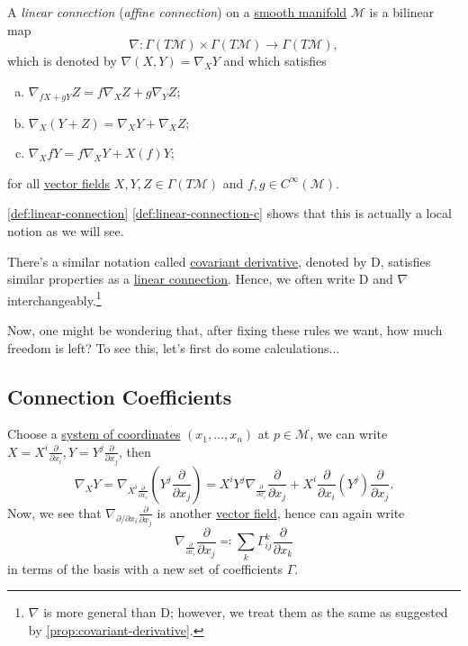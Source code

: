 \begin{definition}\label{def:linear-connection}
	A \emph{linear connection} (\emph{affine connection}) on a \hyperref[def:smooth-manifold]{smooth manifold} \(\mathcal{M}\) is a bilinear map
	\[
		\nabla \colon \Gamma (T \mathcal{M} ) \times \Gamma (T \mathcal{M} ) \to \Gamma (T \mathcal{M} ),
	\]
	which is denoted by \(\nabla (X, Y) = \nabla _X Y\) and which satisfies
	\begin{enumerate}[(a)]
		\item \(\nabla _{fX+gY}Z = f \nabla _X Z + g \nabla _Y Z\);
		\item \(\nabla _X (Y+Z) = \nabla _X Y + \nabla _X Z\);
		      \item\label{def:linear-connection-c} \(\nabla _X fY = f \nabla _X Y + X(f)Y\);
	\end{enumerate}
	for all \hyperref[def:vector-field]{vector fields} \(X, Y, Z\in \Gamma (T \mathcal{M} )\) and \(f, g\in C^{\infty} (\mathcal{M} )\).
\end{definition}

\begin{remark}
	\autoref{def:linear-connection} \autoref{def:linear-connection-c} shows that this is actually a local notion as we will see.
\end{remark}

\begin{note}
	There's a similar notation called \hyperref[def:covariant-derivative]{covariant derivative}, denoted by \(\mathrm{D} \), satisfies similar properties as a \hyperref[def:linear-connection]{linear connection}. Hence, we often write \(\mathrm{D} \) and \(\nabla \) interchangeably.\footnote{\(\nabla \) is more general than \(\mathrm{D}\); however, we treat them as the same as suggested by \autoref{prop:covariant-derivative}.}
\end{note}

Now, one might be wondering that, after fixing these rules we want, how much freedom is left? To see this, let's first do some calculations...

\subsection{Connection Coefficients}
Choose a \hyperref[def:coordinate-chart]{system of coordinates} \((x_1, \ldots , x_n)\) at \(p\in \mathcal{M} \), we can write \(X = X^i \frac{\partial }{\partial x_i}, Y = Y^j \frac{\partial }{\partial x_j}\), then
\[
	\nabla _X Y
	= \nabla _{X^i \frac{\partial }{\partial x_i} } \left( Y^j \frac{\partial }{\partial x_j}  \right)
	= X^i Y^j \nabla _{\frac{\partial }{\partial x_i}} \frac{\partial }{\partial x_j} + X^i \frac{\partial }{\partial x_i}(Y^j)  \frac{\partial }{\partial x_j}.
\]
Now, we see that \(\nabla _{\partial / \partial x_i} \frac{\partial }{\partial x_j}\) is another \hyperref[def:vector-field]{vector field}, hence can again write
\[
	\nabla _{\frac{\partial }{\partial x_i}} \frac{\partial }{\partial x_j} \eqqcolon \sum_{k} \Gamma ^k_{ij} \frac{\partial }{\partial x_k}
\]
in terms of the basis with a new set of coefficients \(\Gamma \).

